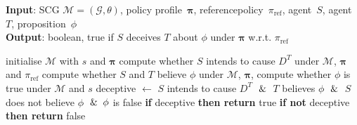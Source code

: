 \documentclass[submission,publicdomain,creativecommons noncommercial]{eptcs}
\begin{document}
\begin{algorithm}
\caption{\textsc{Deception Check}}
\label{alg:deceptioncheck}
\textbf{Input}: SCG $\mathcal{M}=(\mathcal G, \theta)$, policy profile~$\bm{\pi}$, referencepolicy~$\pi_\mathrm{ref}$, agent~$S$, agent~$T$, proposition~$\phi$ \\
\textbf{Output}: boolean, true if $S$ deceives $T$ about $\phi$ under $\bm{\pi}$ w.r.t. $\pi_\mathrm{ref}$
\begin{algorithmic}[1]
\STATE initialise $\mathcal{M}$ with $s$ and $\bm{\pi}$ 
\STATE compute whether $S$ intends to cause $D^T$ under $\mathcal{M}$, $\bm{\pi}$ and $\pi_\mathrm{ref}$
\STATE compute whether $S$ and $T$ believe $\phi$ under $\mathcal{M}$, $\bm{\pi}$,
\STATE compute whether $\phi$ is true under $\mathcal{M}$ and $s$
\STATE deceptive $\leftarrow$ $S$ intends to cause $D^T$ $\And$ $T$ believes $\phi$ $\And$ $S$ does not believe $\phi$ $\And \phi$ is false
\STATE \textbf{if} deceptive \textbf{then return} true
\ENDFOR
\STATE \textbf{if not} deceptive \textbf{then return} false 
\end{algorithmic}
\end{algorithm}


\end{document}

